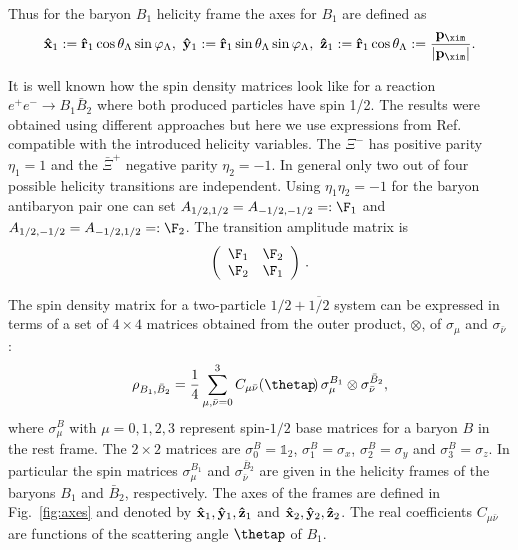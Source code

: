 Thus for the baryon $B_1$ helicity frame the axes for $B_1$ are defined as
\begin{eqnarray}
  \label{eq:def-B1-xyz}
  {\bf\hat x}_1 := {\bf\hat r}_1\cos\theta_{\Lambda}\sin\varphi_{\Lambda}, \
  {\bf\hat y}_1 := {\bf\hat r}_1\sin\theta_{\Lambda}\sin\varphi_{\Lambda}, \ 
  {\bf\hat z}_1 := {\bf\hat r}_1\cos\theta_{\Lambda} := \frac{{\bf p}_{\xim}}{\vert {\bf p}_{\xim} \vert }.
\end{eqnarray}


It is well known how the spin density matrices look like for a
reaction $e^+e^-\to B_1\bar{B}_2$ where both produced particles have
spin 1/2. The results were obtained using different approaches
\cite{AZ96,Czyz:2007wi,TomasiGustafsson:2005kc,Faldt:2013gka,Faldt:2016qee,Faldt:2017kgy} but here we use expressions from Ref.~\cite{Perotti:2018wxm} compatible with the introduced helicity variables.
The $\Xi^-$ has positive parity $\eta_1=1$ and the $\bar\Xi^+$
negative parity $\eta_2=-1$.  In general only two out of four possible
helicity transitions are independent. Using $\eta_1\eta_2 =-1$ for the
baryon antibaryon pair one can set $A_{1/2,1/2}=A_{-1/2,-1/2}=:\F_1$
and $A_{1/2,-1/2}=A_{-1/2,1/2}=:\F_2$.  The transition amplitude
matrix is
\begin{equation}
\left(
\begin{array}{cc}
 {\F_1} & {\F_2} \\
 {\F_2} & {\F_1} \\
\end{array}
\right)\, .
\end{equation}

The spin density matrix for a two-particle $1/2+\overline{1/2}$ system can be expressed
in terms of a set of $4\times 4 $ matrices obtained
from the outer product, $\otimes$, of $\sigma_\mu$ and ${\sigma}_{\bar\nu}$ \cite{Tabakin:1985yv}:
\begin{equation}
  \rho_{B_1,\bar B_2}=\frac{1}{4}\sum_{\mu,\bar\nu=0}^3C_{\mu\bar\nu}(\thetap\!)\,
  \sigma_\mu^{B_1}\otimes
      {\sigma}_{\bar\nu}^{\bar B_2},
\label{eqn:sig12}
\end{equation}
{where $\sigma_\mu^{B}$ with $\mu=0,1,2,3$ represent spin-$1/2$
  base  matrices
  for a  baryon $B$ in the rest frame. The $2\times 2$ matrices
 are $\sigma_0^{B}=\mathds{1}_2$, 
$\sigma_1^{B}=\sigma_x$, $\sigma_2^{B}=\sigma_y$ and $\sigma_3^{B}=\sigma_z$.
In particular the spin matrices $\sigma_\mu^{B_1}$ and
${\sigma}_{\bar\nu}^{\bar B_2}$ are given in the helicity frames of
the baryons $B_1$ and $\bar B_2$, respectively. The axes of the frames
are defined in Fig.~\ref{fig:axes} and denoted by
${\bf\hat x}_1,{\bf\hat y}_1,{\bf \hat z}_1$ and ${\bf\hat x}_2,{\bf\hat y}_2,{\bf\hat z}_2$.
  The real coefficients $C_{\mu\bar\nu}$
  are functions of the scattering angle $\thetap$ of $B_1$.
}

